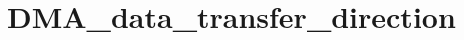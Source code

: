 \hypertarget{group___d_m_a__data__transfer__direction}{\section{D\-M\-A\-\_\-data\-\_\-transfer\-\_\-direction}
\label{group___d_m_a__data__transfer__direction}
}
